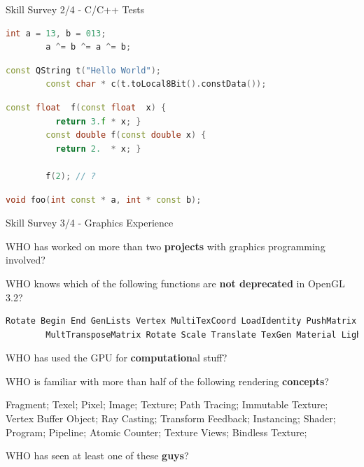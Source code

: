 \begin{frame}[fragile]{Skill Survey 2/4 - C/C++ Tests}

	\pause
	\begin{lstlisting}[language=C++]
		int a = 13, b = 013;
		a ^= b ^= a ^= b;
	\end{lstlisting}

	\pause
	\begin{lstlisting}[language=C++]
		const QString t("Hello World");
		const char * c(t.toLocal8Bit().constData());
	\end{lstlisting}

	\pause
	\begin{lstlisting}[language=C++]
		const float  f(const float  x) { 
		  return 3.f * x; } 
		const double f(const double x) { 
		  return 2.  * x; }

		f(2); // ? 
	\end{lstlisting}

	\pause
	\begin{lstlisting}[language=C++]
		void foo(int const * a, int * const b);
	\end{lstlisting}

\end{frame}


\begin{frame}[fragile]{Skill Survey 3/4 - Graphics Experience}
	
	\pause
	WHO has worked on more than two \textbf{projects} with graphics programming involved?\bigskip

	\pause
	WHO knows which of the following functions are \textbf{not deprecated} in OpenGL 3.2?
	\begin{lstlisting}[language=C++]
		Rotate Begin End GenLists Vertex MultiTexCoord LoadIdentity PushMatrix InterleavedArrays
		MultTransposeMatrix Rotate Scale Translate TexGen Material Light ColorMaterial ShadeModel
	\end{lstlisting}\medskip

	\pause
	WHO has used the GPU for \textbf{computation}al stuff?\bigskip

	\pause
	WHO is familiar with more than half of the following rendering \textbf{concepts}?\par
	\begin{scriptsize}
		Fragment; Texel; Pixel; Image; Texture; Path Tracing; Immutable Texture; Vertex Buffer Object; Ray Casting;
		Transform Feedback; Instancing; Shader; Program; Pipeline; Atomic Counter; Texture Views; Bindless Texture; 
	\end{scriptsize}\bigskip

	\pause
	WHO has seen at least one of these \textbf{guys}?\medskip 


\end{frame}


